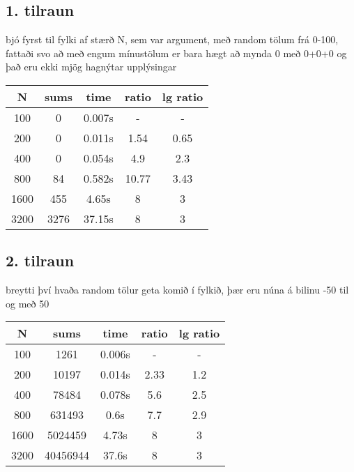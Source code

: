\documentclass{article}
\begin{document}
\subsection*{1. tilraun}
bjó fyrst til fylki af stærð N, sem var argument, með random tölum frá 0-100, fattaði svo að með engum mínustölum er bara hægt að mynda 0 með 0+0+0 og það eru ekki mjög hagnýtar upplýsingar
\begin{center}
    \begin{tabular}{|c|c|c|c|c|}
        \hline
        N&sums&time&ratio&lg ratio\\
        \hline
        100&0&0.007s&-&-\\
        \hline
        200&0&0.011s&1.54&0.65\\
        \hline
        400&0&0.054s&4.9&2.3\\
        \hline
        800&84&0.582s&10.77&3.43\\
        \hline
        1600&455&4.65s&8&3\\
        \hline
        3200&3276&37.15s&8&3\\
        \hline
    \end{tabular}
\end{center}

\subsection*{2. tilraun}
breytti því hvaða random tölur geta komið í fylkið, þær eru núna á bilinu -50 til og með 50
\begin{center}
    \begin{tabular}{|c|c|c|c|c|}
        \hline
        N&sums&time&ratio&lg ratio\\
        \hline
        100&1261&0.006s&-&-\\
        \hline
        200&10197&0.014s&2.33&1.2\\
        \hline
        400&78484&0.078s&5.6&2.5\\
        \hline
        800&631493&0.6s&7.7&2.9\\
        \hline
        1600&5024459&4.73s&8&3\\
        \hline
        3200&40456944&37.6s&8&3\\
        \hline
    \end{tabular}
\end{center}
\end{document}
